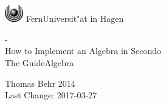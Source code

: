 \documentclass[a4paper,12pt]{article}
\begin{document}
\thispagestyle{empty}


\begin{center}
\begin{huge}
\vspace*{3cm}
   \begin{minipage}{\textwidth}
     \vspace*{\fill}
    \begin{center}
       \includegraphics[width=0.8cm]{logo.eps} FernUniversit"at in Hagen
    \end{center}
     \vfill
   \end{minipage}
   -\\
   How to Implement an Algebra in {\sc Secondo} \\
   {\small The GuideAlgebra} \\[4cm]
\end{huge}
\begin{large}
   Thomas Behr 2014\\[3cm]
   Last Change: 2017-03-27
\end{large}

\end{center}
\clearpage
\thispagestyle{empty} 
\ 
\newpage
\end{document}
